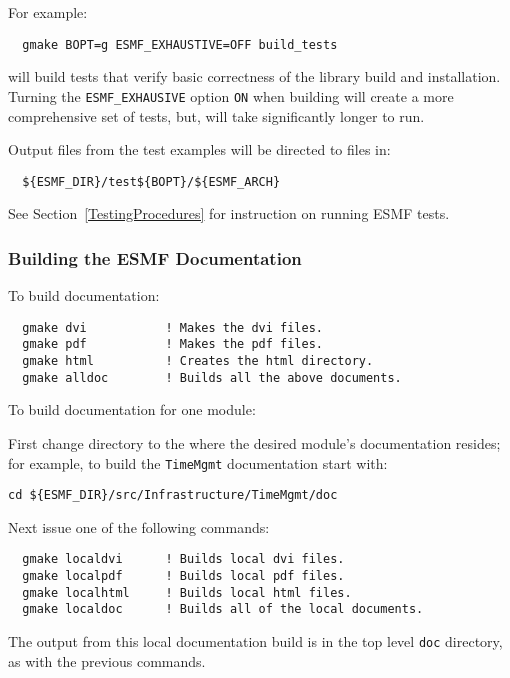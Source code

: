 For example:
\begin{verbatim}
  gmake BOPT=g ESMF_EXHAUSTIVE=OFF build_tests
\end{verbatim}
will build tests that verify basic correctness of the library build and installation. Turning the {\tt ESMF\_EXHAUSIVE} option {\tt ON} when building will create a more comprehensive set of tests, but, will take significantly longer to run. 

Output files from the test examples will be directed to files in:
\begin{verbatim}
  ${ESMF_DIR}/test${BOPT}/${ESMF_ARCH}
\end{verbatim}

See Section~\ref{TestingProcedures} for instruction on running ESMF tests.

\subsubsection{Building the ESMF Documentation}
\label{BuildDocumentation}

\noindent To build documentation:
\begin{verbatim}
  gmake dvi           ! Makes the dvi files.
  gmake pdf           ! Makes the pdf files.
  gmake html          ! Creates the html directory.
  gmake alldoc        ! Builds all the above documents.
\end{verbatim}

\noindent To build documentation for one module:

\noindent First change directory to the where the desired module's documentation resides;  for
example, to build the {\tt TimeMgmt} documentation start with:

\begin{verbatim}
cd ${ESMF_DIR}/src/Infrastructure/TimeMgmt/doc
\end{verbatim}

\noindent Next issue one of the following commands:
\begin{verbatim}
  gmake localdvi      ! Builds local dvi files.
  gmake localpdf      ! Builds local pdf files.
  gmake localhtml     ! Builds local html files.
  gmake localdoc      ! Builds all of the local documents.
\end{verbatim}

\noindent The output from this local documentation build is in the top level {\tt doc}
directory, as with the previous commands.






